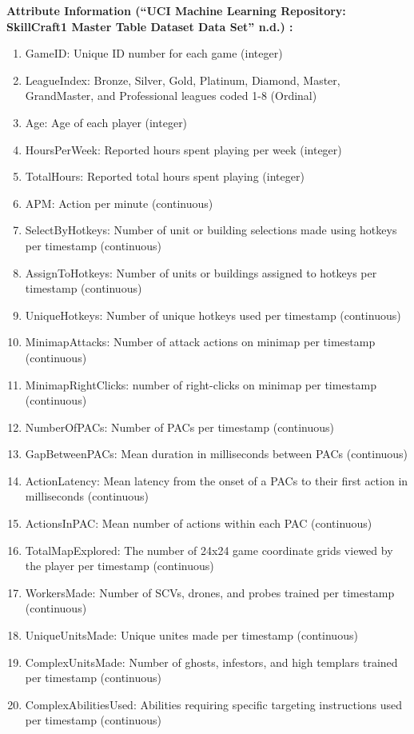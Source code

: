 \documentclass[]{article}
\providecommand{\tightlist}{%
  \setlength{\itemsep}{0pt}\setlength{\parskip}{0pt}}
\begin{document}
\textbf{Attribute Information (``UCI Machine Learning Repository:
SkillCraft1 Master Table Dataset Data Set'' n.d.) :}

\begin{enumerate}
\def\labelenumi{\arabic{enumi}.}
\tightlist
\item
  GameID: Unique ID number for each game (integer)
\item
  LeagueIndex: Bronze, Silver, Gold, Platinum, Diamond, Master,
  GrandMaster, and Professional leagues coded 1-8 (Ordinal)
\item
  Age: Age of each player (integer)
\item
  HoursPerWeek: Reported hours spent playing per week (integer)
\item
  TotalHours: Reported total hours spent playing (integer)
\item
  APM: Action per minute (continuous)
\item
  SelectByHotkeys: Number of unit or building selections made using
  hotkeys per timestamp (continuous)
\item
  AssignToHotkeys: Number of units or buildings assigned to hotkeys per
  timestamp (continuous)
\item
  UniqueHotkeys: Number of unique hotkeys used per timestamp
  (continuous)
\item
  MinimapAttacks: Number of attack actions on minimap per timestamp
  (continuous)
\item
  MinimapRightClicks: number of right-clicks on minimap per timestamp
  (continuous)
\item
  NumberOfPACs: Number of PACs per timestamp (continuous)
\item
  GapBetweenPACs: Mean duration in milliseconds between PACs
  (continuous)
\item
  ActionLatency: Mean latency from the onset of a PACs to their first
  action in milliseconds (continuous)
\item
  ActionsInPAC: Mean number of actions within each PAC (continuous)
\item
  TotalMapExplored: The number of 24x24 game coordinate grids viewed by
  the player per timestamp (continuous)
\item
  WorkersMade: Number of SCVs, drones, and probes trained per timestamp
  (continuous)
\item
  UniqueUnitsMade: Unique unites made per timestamp (continuous)
\item
  ComplexUnitsMade: Number of ghosts, infestors, and high templars
  trained per timestamp (continuous)
\item
  ComplexAbilitiesUsed: Abilities requiring specific targeting
  instructions used per timestamp (continuous)
\end{enumerate}
\end{document}
